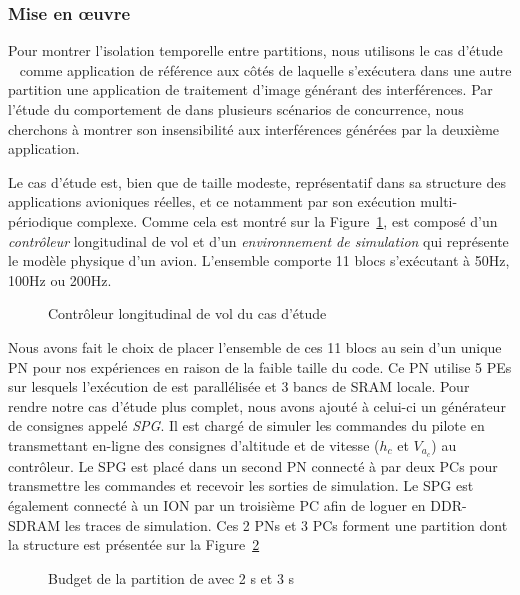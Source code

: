 \documentclass[main.tex]{subfiles}
\begin{document}
\subsubsection{Mise en \oe{}uvre}
Pour montrer l'isolation temporelle entre partitions, nous utilisons le cas d'étude \rosace~\cite{Pagetti2014} comme application de référence aux côtés de laquelle s'exécutera dans une autre partition une application de traitement d'image générant des interférences. Par l'étude du comportement de \rosace dans plusieurs scénarios de concurrence, nous cherchons à montrer son insensibilité aux interférences générées par la deuxième application.

Le cas d'étude \rosace est, bien que de taille modeste, représentatif dans sa structure des applications avioniques réelles, et ce notamment par son exécution multi-périodique complexe. Comme cela est montré sur la Figure~\ref{fig_resumeFr_rosace}, \rosace est composé d'un \emph{contrôleur} longitudinal de vol et d'un \emph{environnement de simulation} qui représente le modèle physique d'un avion. L'ensemble comporte 11 blocs s'exécutant à 50Hz, 100Hz ou 200Hz. 


\begin{figure}
    \centering
    \scalebox{1.5}{}
    \caption{Contrôleur longitudinal de vol du cas d'étude \rosace}
    \label{fig_resumeFr_rosace}
\end{figure}

Nous avons fait le choix de placer l'ensemble de ces 11 blocs au sein d'un unique PN pour nos expériences en raison de la faible taille du code. Ce PN utilise 5 PEs sur lesquels l'exécution de \rosace est parallélisée et 3 bancs de SRAM locale. Pour rendre notre cas d'étude plus complet, nous avons ajouté à celui-ci un générateur de consignes appelé \emph{SPG}. Il est chargé de simuler les commandes du pilote en transmettant en-ligne des consignes d'altitude et de vitesse ($h_c$ et $V_{a_c}$) au contrôleur. Le SPG est placé dans un second PN connecté à \rosace par deux PCs pour transmettre les commandes et recevoir les sorties de simulation. Le SPG est également connecté à un ION par un troisième PC afin de loguer en DDR-SDRAM les traces de simulation. Ces 2 PNs et 3 PCs forment une partition dont la structure est présentée sur la Figure~\ref{fig_resumeFr_rosacePartBudget}

\begin{figure}
    \centering
    \scalebox{0.7}{}
    \caption{Budget de la partition de \rosace avec 2 \PN{}s et 3 \PC{}s}
    \label{fig_resumeFr_rosacePartBudget}
\end{figure}
\end{document}
